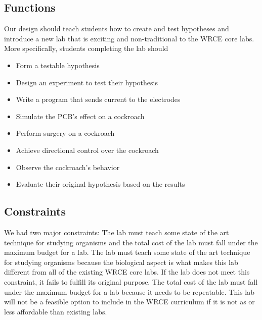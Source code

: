 \documentclass[twocolumn,10pt]{IEEEtran}
\begin{document}
\subsection{Functions}
Our design should teach students how to create and test hypotheses and introduce a new lab that is exciting and non-traditional to the WRCE core labs. More specifically, students completing the lab should
\begin{itemize}
  \item Form a testable hypothesis
  \item Design an experiment to test their hypothesis
  \item Write a program that sends current to the electrodes
  \item Simulate the PCB's effect on a cockroach
  \item Perform surgery on a cockroach
  \item Achieve directional control over the cockroach
  \item Observe the cockroach's behavior
  \item Evaluate their original hypothesis based on the results
\end{itemize}

\subsection{Constraints}
\label{subsec:constraints}
We had two major constraints: The lab must teach some state of the art technique for studying organisms and the total cost of the lab must fall under the maximum budget for a lab. The lab must teach some state of the art technique for studying organisms because the biological aspect is what makes this lab different from all of the existing WRCE core labs. If the lab does not meet this constraint, it fails to fulfill its original purpose. The total cost of the lab must fall under the maximum budget for a lab because it needs to be repeatable. This lab will not be a feasible option to include in the WRCE curriculum if it is not as or less affordable than existing labs.
\end{document}
